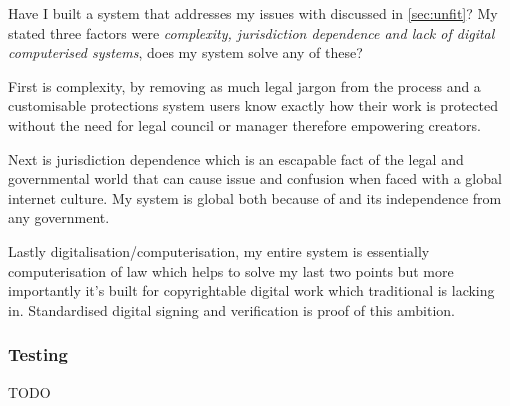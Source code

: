 
Have I built a system that addresses my issues with  discussed in \autoref{sec:unfit}? My stated three factors were \textit{complexity, jurisdiction dependence and lack of digital computerised systems}, does my system solve any of these?

First is complexity, by removing as much legal jargon from the process and a customisable protections system users know exactly how their work is protected without the need for legal council or manager therefore empowering creators. 

Next is jurisdiction dependence which is an escapable fact of the legal and governmental world that can cause issue and confusion when faced with a global internet culture. My system is global both because of  and its independence from any government.

Lastly digitalisation/computerisation, my entire system is essentially computerisation of  law which helps to solve my last two points but more importantly it's built for copyrightable digital work which traditional  is lacking in. Standardised digital signing and verification is proof of this ambition.


\subsubsection{Testing}
TODO
